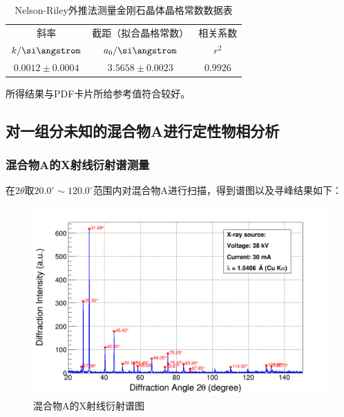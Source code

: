 \documentclass{thuemp}
\begin{document}
\begin{table}[H]
    \centering
    \captionnamefont{\wuhao\bf\heiti}
    \captiontitlefont{\wuhao\bf\heiti}
    \caption{Nelson-Riley外推法测量金刚石晶体晶格常数数据表}
    \label{tab:diamond_xrd_extrapol}
    \liuhao
    \begin{tabular}{ccc}
        \toprule
        斜率 & 截距（拟合晶格常数） & 相关系数 \\
        $k/\text{\si\angstrom}$ & $a_0/\text{\si\angstrom}$ & $r^2$\\
        \midrule
        $0.0012 \pm 0.0004$ & $3.5658 \pm 0.0023$ & $0.9926$ \\
        \bottomrule
    \end{tabular}
\end{table}

所得结果与PDF卡片所给参考值符合较好。


\subsection{对一组分未知的混合物A进行定性物相分析}

\subsubsection{混合物A的X射线衍射谱测量}

在$2\theta$取$20.0^\circ \sim 120.0^\circ$范围内对混合物A进行扫描，得到谱图以及寻峰结果如下：

\begin{figure}[H]
    \centering
    \includegraphics[width=0.8\linewidth]{../Data/Mixture.png}
    \caption{混合物A的X射线衍射谱图}
    \label{fig:mixture_a_xrd}
\end{figure}
\end{document}

